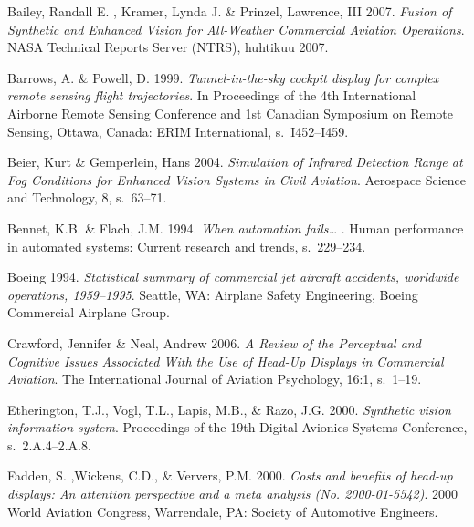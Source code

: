 \documentclass[utf8,bachelor,manualbib]{gradu3}
\begin{document}
\begin{thebibliography}{}

Bailey, Randall E. , Kramer, Lynda J. \& Prinzel, Lawrence, III 2007.
\textit{Fusion of Synthetic and Enhanced Vision for All-Weather Commercial Aviation Operations}.
NASA Technical Reports Server (NTRS), huhtikuu 2007.

Barrows, A. \& Powell, D. 1999.
\textit{Tunnel-in-the-sky cockpit display for complex remote sensing flight
trajectories}.
In Proceedings of the 4th International Airborne Remote Sensing Conference and 1st
Canadian Symposium on Remote Sensing, Ottawa, Canada: ERIM International, s.~I452--I459.

Beier, Kurt \& Gemperlein, Hans 2004.
\textit{Simulation of Infrared Detection Range at Fog Conditions for Enhanced Vision Systems in Civil Aviation}.
Aerospace Science and Technology, 8, s.~63--71.

Bennet, K.B. \& Flach, J.M. 1994.
\textit{When automation fails… }.
Human performance in automated systems: Current research and trends, s.~229--234.

Boeing 1994.
\textit{Statistical summary of commercial jet aircraft accidents, worldwide operations, 1959–1995}.
Seattle, WA: Airplane Safety Engineering, Boeing Commercial Airplane Group.

Crawford, Jennifer \& Neal, Andrew 2006.
\textit{A Review of the Perceptual and Cognitive Issues Associated With the Use of Head-Up Displays in Commercial Aviation}.
The International Journal of Aviation Psychology, 16:1, s.~1--19.

Etherington, T.J., Vogl, T.L., Lapis, M.B., \& Razo, J.G. 2000.
\textit{Synthetic vision information system}.
Proceedings of the 19th Digital Avionics Systems Conference, s.~2.A.4--2.A.8.

Fadden, S. ,Wickens, C.D., \& Ververs, P.M. 2000.
\textit{Costs and benefits of head-up displays: An attention
perspective and a meta analysis (No. 2000-01-5542)}.
2000 World Aviation Congress, Warrendale, PA: Society of Automotive Engineers.


\end{thebibliography}
\end{document}
